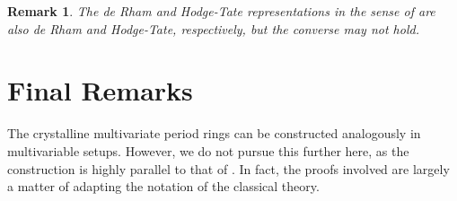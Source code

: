 \documentclass{amsart}
\newtheorem{remark}[proposition]{Remark}
\begin{document}
\begin{remark}
    The de Rham and Hodge-Tate representations in the sense of \cite{BCM} are also de Rham and Hodge-Tate, respectively, but the converse may not hold.
\end{remark}


\section{Final Remarks}
The crystalline multivariate period rings can be constructed analogously in multivariable setups. However, we do not pursue this further here, as the construction is highly parallel to that of \cite{Fontaine}. In fact, the proofs involved are largely a matter of adapting the notation of the classical theory.




\end{document}
